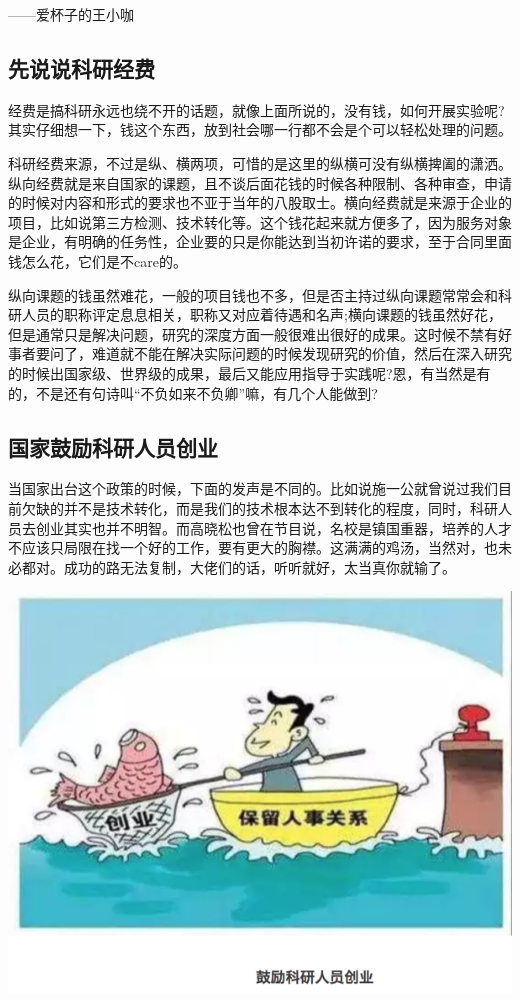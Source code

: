 \documentclass[
]{book}
\begin{document}
------爱杯子的王小咖

\hypertarget{ux5148ux8bf4ux8bf4ux79d1ux7814ux7ecfux8d39}{%
\subsection{先说说科研经费}\label{ux5148ux8bf4ux8bf4ux79d1ux7814ux7ecfux8d39}}

经费是搞科研永远也绕不开的话题，就像上面所说的，没有钱，如何开展实验呢?其实仔细想一下，钱这个东西，放到社会哪一行都不会是个可以轻松处理的问题。

科研经费来源，不过是纵、横两项，可惜的是这里的纵横可没有纵横捭阖的潇洒。纵向经费就是来自国家的课题，且不谈后面花钱的时候各种限制、各种审查，申请的时候对内容和形式的要求也不亚于当年的八股取士。横向经费就是来源于企业的项目，比如说第三方检测、技术转化等。这个钱花起来就方便多了，因为服务对象是企业，有明确的任务性，企业要的只是你能达到当初许诺的要求，至于合同里面钱怎么花，它们是不care的。

纵向课题的钱虽然难花，一般的项目钱也不多，但是否主持过纵向课题常常会和科研人员的职称评定息息相关，职称又对应着待遇和名声;横向课题的钱虽然好花，但是通常只是解决问题，研究的深度方面一般很难出很好的成果。这时候不禁有好事者要问了，难道就不能在解决实际问题的时候发现研究的价值，然后在深入研究的时候出国家级、世界级的成果，最后又能应用指导于实践呢?恩，有当然是有的，不是还有句诗叫``不负如来不负卿''嘛，有几个人能做到?

\hypertarget{ux56fdux5bb6ux9f13ux52b1ux79d1ux7814ux4ebaux5458ux521bux4e1a}{%
\subsection{国家鼓励科研人员创业}\label{ux56fdux5bb6ux9f13ux52b1ux79d1ux7814ux4ebaux5458ux521bux4e1a}}

当国家出台这个政策的时候，下面的发声是不同的。比如说施一公就曾说过我们目前欠缺的并不是技术转化，而是我们的技术根本达不到转化的程度，同时，科研人员去创业其实也并不明智。而高晓松也曾在节目说，名校是镇国重器，培养的人才不应该只局限在找一个好的工作，要有更大的胸襟。这满满的鸡汤，当然对，也未必都对。成功的路无法复制，大佬们的话，听听就好，太当真你就输了。

\includegraphics[width=8.33in]{images/kq1}
\end{document}
